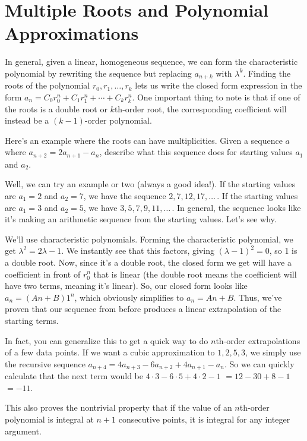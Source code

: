 \documentclass[12pt,letterpaper]{article}
\begin{document}
\section{Multiple Roots and Polynomial Approximations}
In general, given a linear, homogeneous sequence, we can form the
characteristic polynomial by rewriting the sequence but replacing
$a_{n+k}$ with $\lambda^k$. Finding the roots of the polynomial
$r_0, r_1, \ldots, r_k$ lets us write the closed form expression in the
form $a_n = C_0 r_0^n + C_1 r_1^n + \cdots + C_k r_k^n$. One important
thing to note is that if one of the roots is a double root or
$k$th-order root, the corresponding coefficient will instead be a $(k-1)$-order
polynomial.

Here's an example where the roots can have multiplicities. Given a
sequence $a$ where $a_{n+2} = 2a_{n+1} - a_n$, describe what
this sequence does for starting values $a_1$ and $a_2$.

Well, we can try an example or two (always a good idea!). If the starting
values are $a_1 = 2$ and $a_2 = 7$, we have the sequence $2, 7, 12, 17, \ldots\,$.
If the starting values are $a_1 = 3$ and $a_2 = 5$, we have $3, 5, 7, 9, 11, \ldots\,$.
In general, the sequence looks like it's making an arithmetic sequence from
the starting values. Let's see why.

We'll use characteristic polynomials. Forming the characteristic polynomial,
we get $\lambda^2 = 2\lambda - 1$. We instantly see that this factors, giving
$(\lambda - 1)^2 = 0$, so 1 is a double root. Now, since it's a double root,
the closed form we get will have a coefficient in front of $r_0^n$ that is
linear (the double root means the coefficient will have two terms, meaning it's linear).
So, our closed form looks like $a_n = (An + B)1^n$, which obviously simplifies to $a_n = An+B$.
Thus, we've proven that our sequence from before produces a linear extrapolation
of the starting terms.

In fact, you can generalize this to get a quick way to do $n$th-order extrapolations
of a few data points. If we want a cubic approximation to $1, 2, 5, 3$, we simply
use the recursive sequence $a_{n+4} = 4a_{n+3} - 6a_{n+2} + 4a_{n+1} - a_n$. So we
can quickly calculate that the next term would be $4 \cdot 3 - 6 \cdot 5 + 4 \cdot
2 - 1$ $= 12 - 30 + 8 - 1$ $=-11$.

This also proves the nontrivial property that if the value of an
$n$th-order polynomial is integral at $n+1$ consecutive points, it is integral
for any integer argument.
\end{document}
